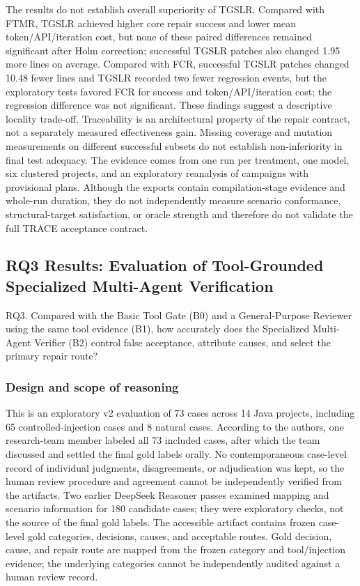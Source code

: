 \documentclass[pdflatex,sn-basic,Numbered,iicol]{sn-jnl}
\begin{document}
The results do not establish overall superiority of TGSLR. Compared with FTMR, TGSLR achieved higher core repair success and lower mean token/API/iteration cost, but none of these paired differences remained significant after Holm correction; successful TGSLR patches also changed 1.95 more lines on average. Compared with FCR, successful TGSLR patches changed 10.48 fewer lines and TGSLR recorded two fewer regression events, but the exploratory tests favored FCR for success and token/API/iteration cost; the regression difference was not significant. These findings suggest a descriptive locality trade-off. Traceability is an architectural property of the repair contract, not a separately measured effectiveness gain. Missing coverage and mutation measurements on different successful subsets do not establish non-inferiority in final test adequacy. The evidence comes from one run per treatment, one model, six clustered projects, and an exploratory reanalysis of campaigns with provisional plans. Although the exports contain compilation-stage evidence and whole-run duration, they do not independently measure scenario conformance, structural-target satisfaction, or oracle strength and therefore do not validate the full TRACE acceptance contract.

\subsection{RQ3 Results: Evaluation of Tool-Grounded Specialized Multi-Agent Verification}\label{subsec:rq3}

RQ3. Compared with the Basic Tool Gate (B0) and a General-Purpose Reviewer using the same tool evidence (B1), how accurately does the Specialized Multi-Agent Verifier (B2) control false acceptance, attribute causes, and select the primary repair route?

\subsubsection{Design and scope of reasoning}\label{subsubsec:rq3-design}

This is an exploratory v2 evaluation of 73 cases across 14 Java projects, including 65 controlled-injection cases and 8 natural cases. According to the authors, one research-team member labeled all 73 included cases, after which the team discussed and settled the final gold labels orally. No contemporaneous case-level record of individual judgments, disagreements, or adjudication was kept, so the human review procedure and agreement cannot be independently verified from the artifacts. Two earlier DeepSeek Reasoner passes examined mapping and scenario information for 180 candidate cases; they were exploratory checks, not the source of the final gold labels. The accessible artifact contains frozen case-level gold categories, decisions, causes, and acceptable routes. Gold decision, cause, and repair route are mapped from the frozen category and tool/injection evidence; the underlying categories cannot be independently audited against a human review record.
\end{document}
